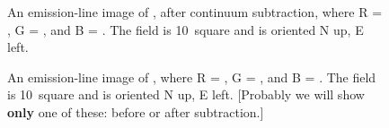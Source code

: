 \begin{figure}
\caption{An emission-line image of \gal, after continuum subtraction, where R = \ha, G = \sii, and B = \oiii.  The field is 10\arcmin\ square and is oriented N up, E left. }
\end{figure}

\begin{figure}
\caption{An emission-line image of \gal, where R = \ha, G = \sii, and B = \oiii.  The field is 10\arcmin\ square and is oriented N up, E left.  [Probably we will show {\bf only} one of these: before or after subtraction.] }
\end{figure}

\vspace{5mm}









